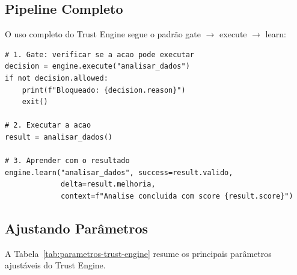 \subsection{Pipeline Completo}

O uso completo do Trust Engine segue o padrão gate $\to$ execute
$\to$ learn:

\begin{lstlisting}[style=pythonstyle]
# 1. Gate: verificar se a acao pode executar
decision = engine.execute("analisar_dados")
if not decision.allowed:
    print(f"Bloqueado: {decision.reason}")
    exit()

# 2. Executar a acao
result = analisar_dados()

# 3. Aprender com o resultado
engine.learn("analisar_dados", success=result.valido,
             delta=result.melhoria,
             context=f"Analise concluida com score {result.score}")
\end{lstlisting}

\subsection{Ajustando Parâmetros}

A Tabela~\ref{tab:parametros-trust-engine} resume os principais
parâmetros ajustáveis do Trust Engine.

\begin{table}[htb]
\centering
    \small
\caption{Parâmetros ajustáveis do Trust Engine}
\label{tab:parametros-trust-engine}
\end{table}

